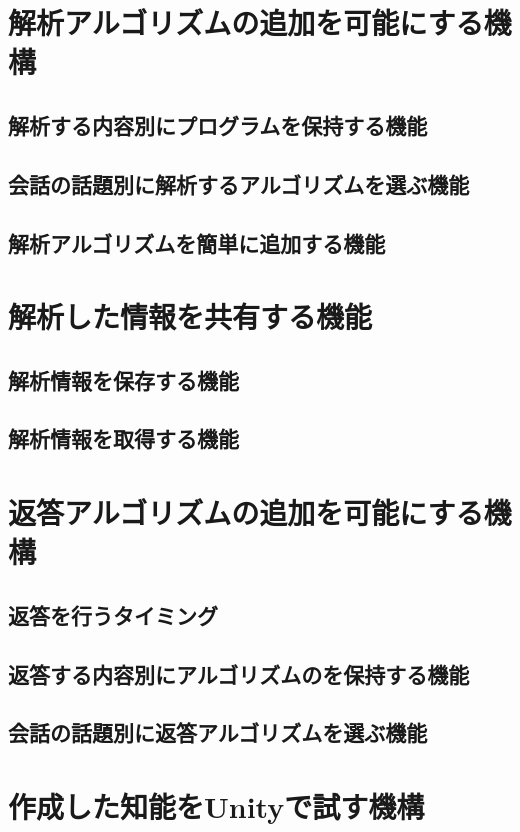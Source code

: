 
\section{解析アルゴリズムの追加を可能にする機構}
\subsection{解析する内容別にプログラムを保持する機能}
\subsection{会話の話題別に解析するアルゴリズムを選ぶ機能}
\subsection{解析アルゴリズムを簡単に追加する機能}

\section{解析した情報を共有する機能}
\subsection{解析情報を保存する機能}
\subsection{解析情報を取得する機能}

\section{返答アルゴリズムの追加を可能にする機構}
\subsection{返答を行うタイミング}
\subsection{返答する内容別にアルゴリズムのを保持する機能}
\subsection{会話の話題別に返答アルゴリズムを選ぶ機能}

\section{作成した知能をUnityで試す機構}
